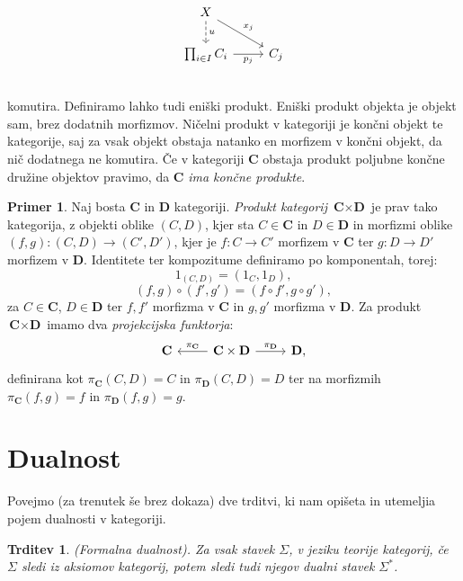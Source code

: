 \documentclass[12pt,a4paper]{book}
\theoremstyle{definition}
\theoremstyle{plain}
\newtheorem{trditev}[definicija]{Trditev}
\theoremstyle{definition}
\newtheorem{primer}{Primer}[section]
\theoremstyle{remark}
\newcommand{\cat}[1]{\textbf{#1}}
\begin{document}
$$\begin{tikzcd}
X \ar[d, dashed, "u"] \ar[dr, "x_j"] & \\
\prod_{i \in I}C_i \ar[r, "p_j"'] & C_j \\
\end{tikzcd}$$
komutira.
%
Definiramo lahko tudi eniški produkt. Eniški produkt objekta je objekt sam, brez dodatnih morfizmov. Ničelni produkt v kategoriji je končni objekt te kategorije, saj za vsak objekt obstaja natanko en morfizem v končni objekt, da nič dodatnega ne komutira. Če v kategoriji $\cat{C}$ obstaja produkt poljubne končne družine objektov pravimo, da $\cat{C}$ \emph{ima končne produkte}.
%
\begin{primer}
Naj bosta $\cat{C}$ in $\cat{D}$ kategoriji. \emph{Produkt kategorij} $\cat{C} \times \cat{D}$ je prav tako kategorija, z objekti oblike $(C,D)$, kjer sta $C \in \cat{C}$ in $D \in \cat{D}$ in morfizmi oblike $(f,g) : (C,D) \to (C',D')$, kjer je $f : C \to C'$ morfizem v $\cat{C}$ ter $g : D \to D'$ morfizem v $\cat{D}$. Identitete ter kompozitume definiramo po komponentah, torej:
\begin{equation*}
1_{(C,D)} = (1_C,1_D),
\end{equation*}
\begin{equation*}
(f,g) \circ (f',g') = (f \circ f', g \circ g'),
\end{equation*}
za $C \in \cat{C}$, $D \in \cat{D}$ ter $f,f'$ morfizma v $\cat{C}$ in $g,g'$ morfizma v $\cat{D}$.
Za produkt $\cat{C} \times \cat{D}$ imamo dva \textit{projekcijska funktorja}:
\[
\begin{tikzcd}
\cat{C} & \arrow[l, "\pi_{\cat{C}}"'] \cat{C} \times \cat{D} \arrow[r, "\pi_{\cat{D}}"] & \cat{D},
\end{tikzcd}
\]
definirana kot $\pi_{\cat{C}}(C,D) = C$ in $\pi_{\cat{D}}(C,D) = D$ ter na morfizmih $\pi_{\cat{C}}(f,g) = f$ in $\pi_{\cat{D}}(f,g) = g$.
\end{primer}

\section{Dualnost}
Povejmo (za trenutek še brez dokaza) dve trditvi, ki nam opišeta in utemeljia pojem dualnosti v kategoriji.

\begin{trditev} \textit{(Formalna dualnost)}. 
Za vsak stavek $\Sigma$, v jeziku teorije kategorij, če $\Sigma$ sledi iz aksiomov kategorij, potem sledi tudi njegov dualni stavek $\Sigma^*$.
\end{trditev}
\end{document}
